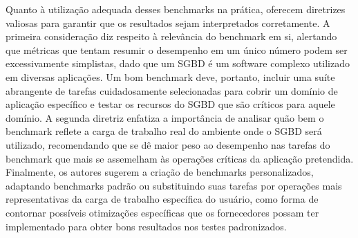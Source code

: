 Quanto à utilização adequada desses benchmarks na prática,  oferecem diretrizes valiosas para garantir que os resultados sejam interpretados corretamente. A primeira consideração diz respeito à relevância do benchmark em si, alertando que métricas que tentam resumir o desempenho em um único número podem ser excessivamente simplistas, dado que um SGBD é um software complexo utilizado em diversas aplicações. Um bom benchmark deve, portanto, incluir uma suíte abrangente de tarefas cuidadosamente selecionadas para cobrir um domínio de aplicação específico e testar os recursos do SGBD que são críticos para aquele domínio. A segunda diretriz enfatiza a importância de analisar quão bem o benchmark reflete a carga de trabalho real do ambiente onde o SGBD será utilizado, recomendando que se dê maior peso ao desempenho nas tarefas do benchmark que mais se assemelham às operações críticas da aplicação pretendida. Finalmente, os autores sugerem a criação de benchmarks personalizados, adaptando benchmarks padrão ou substituindo suas tarefas por operações mais representativas da carga de trabalho específica do usuário, como forma de contornar possíveis otimizações específicas que os fornecedores possam ter implementado para obter bons resultados nos testes padronizados.
